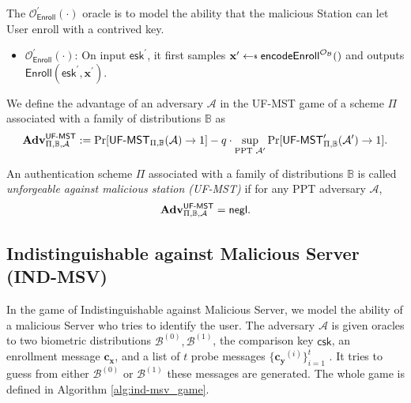 The $\mathcal{O}_\textsf{Enroll}^\prime (\cdot)$ oracle is to model the ability that the malicious \textsf{Station} can let \textsf{User} enroll with a contrived key.

\begin{itemize}

	\item $\mathcal{O}_\textsf{Enroll}^\prime (\cdot)$: On input $\textsf{esk}^\prime$, it first samples $\mathbf{x}^\prime \getsdollar \textsf{encodeEnroll}^{\mathcal{O}_{\mathcal{B}}}()$ and outputs $\textsf{Enroll}(\textsf{esk}^\prime, \mathbf{x}^\prime)$.

\end{itemize}

We define the advantage of an adversary $\mathcal{A}$ in the \textsf{UF-MST} game of a scheme $\Pi$ associated with a family of distributions $\mathbb{B}$ as
\[
	\mathbf{Adv}^{\textsf{UF-MST}}_{\Pi, \mathbb{B}, \mathcal{A}} := \Pr[{\textsf{UF-MST}}_{\Pi, \mathbb{B}}(\mathcal{A}) \to 1] -
	q \cdot \sup_{\text{PPT } \mathcal{A}^\prime} \Pr[\textsf{UF-MST}^\prime_{\Pi, \mathbb{B}}(\mathcal{A}^\prime) \to 1].
\]

An authentication scheme $\Pi$ associated with a family of distributions $\mathbb{B}$ is called \emph{unforgeable against malicious station (UF-MST)} if for any PPT adversary $\mathcal{A}$,
\[
	\mathbf{Adv}^{\textsf{UF-MST}}_{\Pi, \mathbb{B}, \mathcal{A}} = \mathsf{negl}.
\]




\subsection{Indistinguishable against Malicious Server (IND-MSV)}
\label{sec:ind-msv_game}

In the game of Indistinguishable against Malicious Server, we model the ability of a malicious \textsf{Server} who tries to identify the user. The adversary $\mathcal{A}$ is given oracles to two biometric distributions $\mathcal{B}^{(0)}, \mathcal{B}^{(1)}$, the comparison key $\textsf{csk}$, an enrollment message $\mathbf{c_x}$, and a list of $t$ probe messages $\{ \mathbf{c_y}^{(i)} \}_{i=1}^t$ . It tries to guess from either $\mathcal{B}^{(0)}$ or $ \mathcal{B}^{(1)}$ these messages are generated. The whole game is defined in Algorithm \ref{alg:ind-msv_game}.


